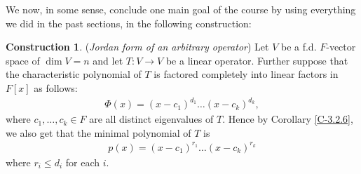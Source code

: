 \documentclass[letterpaper,11pt,twoside]{article}
\theoremstyle{definition}
\theoremstyle{definition}
\theoremstyle{definition}
\theoremstyle{definition}
\theoremstyle{definition}
\newtheorem{construct}[proposition]{\textbf{Construction}}
\theoremstyle{definition}
\theoremstyle{remark}
\theoremstyle{definition}
\begin{document}
We now, in some sense, conclude one main goal of the course by using everything we did in the past sections, in the following construction:
\begin{construct}\label{CT-3.3.2}
	(\textit{Jordan form of an arbitrary operator}) Let $ V $ be a f.d. $ F $-vector space of $ \dim V = n $ and let $ T : V\to V $ be a linear operator. Further suppose that the characteristic polynomial of $ T $ is factored completely into linear factors in $F[x] $ as follows:
	\begin{align*}
		\Phi(x) = (x-c_1)^{d_1}\dots (x-c_k)^{d_k},
	\end{align*}
 	where $ c_1,\dots, c_k \in F $ are all distinct eigenvalues of $ T $. Hence by Corollary \ref{C-3.2.6}, we also get that the minimal polynomial of $ T $ is
 	\begin{align*}
 		p(x) = (x-c_1)^{r_1}\dots (x-c_k)^{r_k}
 	\end{align*}
 	where $ r_i \le d_i $ for each $ i $.\\
 	

\end{construct}
\end{document}
